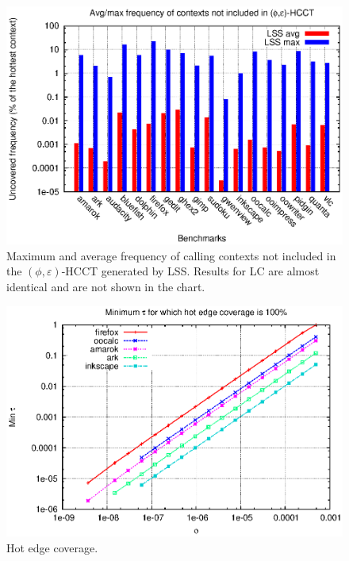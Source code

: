 \documentclass[preprint]{sigplanconf}
\begin{document}
\begin{figure}[t]
\center\includegraphics[width=7.8 cm]{charts/avg-max-uncovered.eps}
\caption{Maximum and average frequency of calling contexts not included in the $(\phi,\varepsilon)$-HCCT generated by LSS. Results for LC are almost identical and are not shown in the chart.}
\label{fig:frequencyUncovered}
\end{figure} 

\begin{figure}[t]
\center\includegraphics[width=7.4 cm]{charts/mintau.eps}
\caption{Hot edge coverage.}
\label{fig:hotEdgeCoverage}
\end{figure} 
\end{document}
